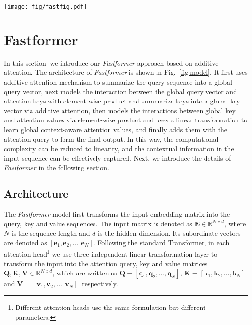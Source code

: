 \documentclass[11pt,a4paper]{article}
\begin{document}
\begin{figure*}[!t]
  \centering 
      \texttt{[image: fig/fastfig.pdf]}
  \caption{The architecture of \textit{Fastformer}.}\label{fig.model}

\end{figure*}

\section{Fastformer}\label{sec:Model}

In this section, we introduce our \textit{Fastformer} approach based on additive attention.
The architecture of \textit{Fastformer} is shown in Fig.~\ref{fig.model}.
It first uses additive attention mechanism to summarize the query sequence into a global query vector, next models the interaction between the global query vector and attention keys with element-wise product and summarize keys into a global key vector via additive attention, then models the interactions between global key and attention values via element-wise product and uses a linear transformation to learn global context-aware attention values, and finally adds them with the attention query to form the final output.
In this way, the computational complexity can be reduced to linearity, and the contextual information in the input sequence can be effectively captured.
Next, we introduce the details of \textit{Fastformer} in the following section.

\subsection{Architecture}

The \textit{Fastformer} model first transforms the input embedding matrix into the query, key and value sequences.
The input matrix is denoted as $\mathbf{E}\in \mathbb{R}^{N\times d}$, where $N$ is the sequence length and $d$ is the hidden dimension.
Its subordinate vectors are denoted as $[\mathbf{e}_1, \mathbf{e}_2, ..., \mathbf{e}_N]$.
Following the standard Transformer, in each attention head\footnote{Different attention heads use the same formulation but different parameters.} we use three independent linear transformation layer to transform the input into the attention query, key and value matrices $\mathbf{Q}, \mathbf{K}, \mathbf{V}\in \mathbb{R}^{N\times d}$, which are written as $\mathbf{Q}=[\mathbf{q}_1, \mathbf{q}_2, ..., \mathbf{q}_N]$, $\mathbf{K}=[\mathbf{k}_1, \mathbf{k}_2, ..., \mathbf{k}_N]$ and $\mathbf{V}=[\mathbf{v}_1, \mathbf{v}_2, ..., \mathbf{v}_N]$, respectively.
\end{document}
